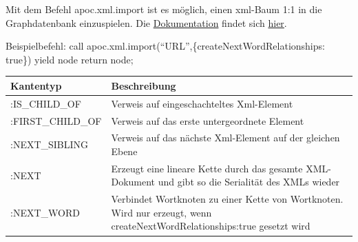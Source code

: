 \documentclass[12pt,ngerman,]{article}
\begin{document}
Mit dem Befehl apoc.xml.import ist es möglich, einen xml-Baum 1:1 in die
Graphdatenbank einzuspielen. Die
\href{https://neo4j-contrib.github.io/neo4j-apoc-procedures/\#_import_xml_directly}{Dokumentation}
findet sich
\href{https://neo4j-contrib.github.io/neo4j-apoc-procedures/\#_import_xml_directly}{hier}.

Beispielbefehl: call
apoc.xml.import(``URL'',\{createNextWordRelationships: true\}) yield
node return node;

\begin{longtable}[]{@{}ll@{}}
\toprule
\begin{minipage}[b]{0.32\columnwidth}\raggedright\strut
Kantentyp\strut
\end{minipage} & \begin{minipage}[b]{0.62\columnwidth}\raggedright\strut
Beschreibung\strut
\end{minipage}\tabularnewline
\midrule
\endhead
\begin{minipage}[t]{0.32\columnwidth}\raggedright\strut
:IS\_CHILD\_OF\strut
\end{minipage} & \begin{minipage}[t]{0.62\columnwidth}\raggedright\strut
Verweis auf eingeschachteltes Xml-Element\strut
\end{minipage}\tabularnewline
\begin{minipage}[t]{0.32\columnwidth}\raggedright\strut
:FIRST\_CHILD\_OF\strut
\end{minipage} & \begin{minipage}[t]{0.62\columnwidth}\raggedright\strut
Verweis auf das erste untergeordnete Element\strut
\end{minipage}\tabularnewline
\begin{minipage}[t]{0.32\columnwidth}\raggedright\strut
:NEXT\_SIBLING\strut
\end{minipage} & \begin{minipage}[t]{0.62\columnwidth}\raggedright\strut
Verweis auf das nächste Xml-Element auf der gleichen Ebene\strut
\end{minipage}\tabularnewline
\begin{minipage}[t]{0.32\columnwidth}\raggedright\strut
:NEXT\strut
\end{minipage} & \begin{minipage}[t]{0.62\columnwidth}\raggedright\strut
Erzeugt eine lineare Kette durch das gesamte XML-Dokument und gibt so
die Serialität des XMLs wieder\strut
\end{minipage}\tabularnewline
\begin{minipage}[t]{0.32\columnwidth}\raggedright\strut
:NEXT\_WORD\strut
\end{minipage} & \begin{minipage}[t]{0.62\columnwidth}\raggedright\strut
Verbindet Wortknoten zu einer Kette von Wortknoten. Wird nur erzeugt,
wenn createNextWordRelationships:true gesetzt wird\strut
\end{minipage}\tabularnewline
\bottomrule
\end{longtable}
\end{document}
